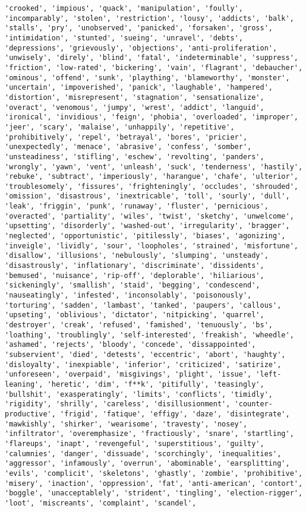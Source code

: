 \documentclass[11pt]{article}
\begin{document}
\begin{Verbatim}[commandchars=\\\{\}]
'crooked', 'impious', 'quack', 'manipulation', 'foully', 'incomparably', 'stolen', 'restriction', 'lousy', 'addicts', 'balk', 'stalls', 'pry', 'unobserved', 'panicked', 'forsaken', 'gross', 'intimidation', 'stunted', 'sueing', 'unravel', 'debts', 'depressions', 'grievously', 'objections', 'anti-proliferation', 'unwisely', 'direly', 'blind', 'fatal', 'indeterminable', 'suppress', 'friction', 'low-rated', 'bickering', 'vain', 'flagrant', 'debaucher', 'ominous', 'offend', 'sunk', 'plaything', 'blameworthy', 'monster', 'uncertain', 'impoverished', 'panick', 'laughable', 'hampered', 'distortion', 'misrepresent', 'stagnation', 'sensationalize', 'overact', 'venomous', 'jumpy', 'wrest', 'addict', 'languid', 'ironical', 'invidious', 'feign', 'phobia', 'overloaded', 'improper', 'jeer', 'scary', 'malaise', 'unhappily', 'repetitive', 'prohibitively', 'repel', 'betrayal', 'bores', 'pricier', 'unexpectedly', 'menace', 'abrasive', 'confess', 'somber', 'unsteadiness', 'stifling', 'eschew', 'revolting', 'panders', 'wrongly', 'yawn', 'vent', 'unleash', 'suck', 'tenderness', 'hastily', 'rebuke', 'subtract', 'imperiously', 'harangue', 'chafe', 'ulterior', 'troublesomely', 'fissures', 'frighteningly', 'occludes', 'shrouded', 'omission', 'disastrous', 'inextricable', 'toll', 'sourly', 'dull', 'leak', 'friggin', 'punk', 'runaway', 'fluster', 'pernicious', 'overacted', 'partiality', 'wiles', 'twist', 'sketchy', 'unwelcome', 'upsetting', 'disorderly', 'washed-out', 'irregularity', 'bragger', 'neglected', 'opportunistic', 'pitilessly', 'biases', 'agonizing', 'inveigle', 'lividly', 'sour', 'loopholes', 'strained', 'misfortune', 'disallow', 'illusions', 'nebulously', 'slumping', 'unsteady', 'disastrously', 'inflationary', 'discriminate', 'dissidents', 'bemused', 'nuisance', 'rip-off', 'deplorable', 'hiliarious', 'sickeningly', 'smallish', 'staid', 'begging', 'condescend', 'nauseatingly', 'infested', 'inconsolably', 'poisonously', 'torturing', 'sadden', 'lambast', 'tanked', 'paupers', 'callous', 'upseting', 'oblivious', 'dictator', 'nitpicking', 'quarrel', 'destroyer', 'creak', 'refused', 'famished', 'tenuously', 'bs', 'loathing', 'troublingly', 'self-interested', 'freakish', 'wheedle', 'ashamed', 'rejects', 'bloody', 'concede', 'dissappointed', 'subservient', 'died', 'detests', 'eccentric', 'abort', 'haughty', 'disloyalty', 'inexpiable', 'inferior', 'criticized', 'satirize', 'unforeseen', 'overpaid', 'misgivings', 'plight', 'issue', 'left-leaning', 'heretic', 'dim', 'f**k', 'pitifully', 'teasingly', 'bullshit', 'exasperatingly', 'limits', 'conflicts', 'timidly', 'rigidity', 'shrilly', 'careless', 'disillusionment', 'counter-productive', 'frigid', 'fatique', 'effigy', 'daze', 'disintegrate', 'mawkishly', 'shirker', 'wearisome', 'travesty', 'nosey', 'infiltrator', 'overemphasize', 'fractiously', 'snare', 'startling', 'flareups', 'inapt', 'revengeful', 'superstitious', 'guilty', 'calumnies', 'danger', 'dissuade', 'scorchingly', 'inequalities', 'aggressor', 'infamously', 'overrun', 'abominable', 'earsplitting', 'evils', 'complicit', 'skeletons', 'ghastly', 'zombie', 'prohibitive', 'misery', 'inaction', 'oppression', 'fat', 'anti-american', 'contort', 'boggle', 'unacceptablely', 'strident', 'tingling', 'election-rigger', 'loot', 'miscreants', 'complaint', 'scandel', 
\end{Verbatim}
\end{document}
